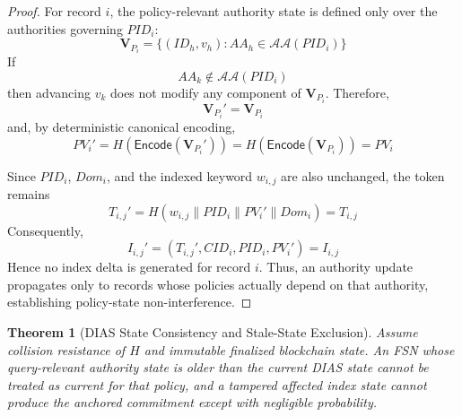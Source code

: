 \documentclass{ieeetj}
\theoremstyle{ieee-style}
\newtheorem{theorem}{Theorem}[subsection]
\begin{document}
\begin{proof}
For record $i$, the policy-relevant authority state is defined only over
the authorities governing $PID_i$:
\begin{equation}
\mathbf{V}_{P_i}
=
\{(ID_h,v_h):AA_h\in\mathcal{AA}(PID_i)\}
\end{equation}
If
\begin{equation}
AA_k\notin\mathcal{AA}(PID_i)
\end{equation}
then advancing $v_k$ does not modify any component of
$\mathbf{V}_{P_i}$. Therefore,
\begin{equation}
\mathbf{V}_{P_i}'=\mathbf{V}_{P_i}
\end{equation}
and, by deterministic canonical encoding,
\begin{equation}
PV_i'
=
H(\mathsf{Encode}(\mathbf{V}_{P_i}'))
=
H(\mathsf{Encode}(\mathbf{V}_{P_i}))
=
PV_i
\end{equation}

Since $PID_i$, $Dom_i$, and the indexed keyword $w_{i,j}$ are also
unchanged, the token remains
\begin{equation}
T_{i,j}'
=
H(w_{i,j}\parallel PID_i\parallel PV_i'\parallel Dom_i)
=
T_{i,j}
\end{equation}
Consequently,
\begin{equation}
I_{i,j}'=(T_{i,j}',CID_i,PID_i,PV_i')
=
I_{i,j}
\end{equation}
Hence no index delta is generated for record $i$. Thus, an authority
update propagates only to records whose policies actually depend on that
authority, establishing policy-state non-interference.
\end{proof}


\begin{theorem}[DIAS State Consistency and Stale-State Exclusion]
Assume collision resistance of $H$ and immutable finalized blockchain
state. An FSN whose query-relevant authority state is older than the
current DIAS state cannot be treated as current for that policy, and a
tampered affected index state cannot produce the anchored commitment
except with negligible probability.
\end{theorem}
\end{document}
